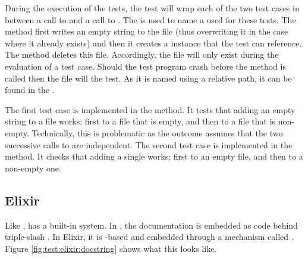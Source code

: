 During the execution of the tests, the test  will wrap each of the two test cases in between a call to  and a call to . The   is used to name a  used for these tests. The  method first writes an empty string to the file (thus overwriting it in the case where it already exists) and then it creates a  instance that the test can reference. The  method deletes this file. Accordingly, the file will only exist during the evaluation of a test case. Should the test program crash before the  method is called then the file will  the test. As it is named using a relative path, it can be found in the .

The first test case is implemented in the  method. It tests that adding an empty string to a file works; first to a file that is empty, and then to a file that is non-empty. Technically, this is problematic as the outcome assumes that the two successive calls to  are independent. The second test case is implemented in the  method. It checks that adding a single  works; first to an empty file, and then to a non-empty one.

\subsection{Elixir}


Like \csharp,  has a built-in  system. In \csharp, the documentation is embedded as  code behind triple-slash . In Elixir, it is -based and embedded through a mechanism called . Figure \ref{fig:test:elixir:docstring} shows what this looks like.

